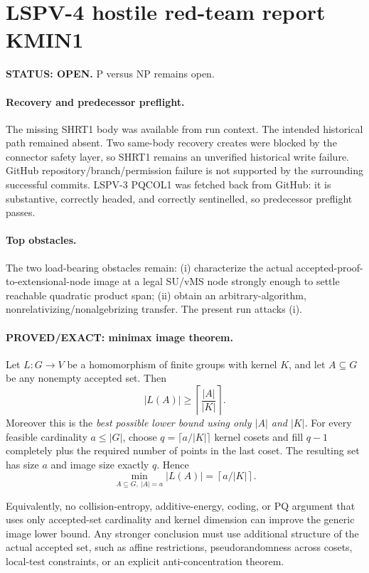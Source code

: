 \documentclass[11pt]{article}
\begin{document}
\section*{LSPV-4 hostile red-team report KMIN1}
\textbf{STATUS: OPEN.} P versus NP remains open.

\paragraph{Recovery and predecessor preflight.}
The missing SHRT1 body was available from run context. The intended historical path remained absent. Two same-body recovery creates were blocked by the connector safety layer, so SHRT1 remains an unverified historical write failure. GitHub repository/branch/permission failure is not supported by the surrounding successful commits. LSPV-3 PQCOL1 was fetched back from GitHub: it is substantive, correctly headed, and correctly sentinelled, so predecessor preflight passes.

\paragraph{Top obstacles.}
The two load-bearing obstacles remain: (i) characterize the actual accepted-proof-to-extensional-node image at a legal SU/vMS node strongly enough to settle reachable quadratic product span; (ii) obtain an arbitrary-algorithm, nonrelativizing/nonalgebrizing transfer. The present run attacks (i).

\paragraph{PROVED/EXACT: minimax image theorem.}
Let $L:G\to V$ be a homomorphism of finite groups with kernel $K$, and let $A\subseteq G$ be any nonempty accepted set. Then
\[
|L(A)|\ge \left\lceil\frac{|A|}{|K|}\right\rceil.
\]
Moreover this is the \emph{best possible lower bound using only $|A|$ and $|K|$}. For every feasible cardinality $a\le |G|$, choose $q=\lceil a/|K|\rceil$ kernel cosets and fill $q-1$ completely plus the required number of points in the last coset. The resulting set has size $a$ and image size exactly $q$. Hence
\[
\boxed{\min_{A\subseteq G,\ |A|=a}|L(A)|=\left\lceil a/|K|\right\rceil.}
\]

Equivalently, no collision-entropy, additive-energy, coding, or PQ argument that uses only accepted-set cardinality and kernel dimension can improve the generic image lower bound. Any stronger conclusion must use additional structure of the actual accepted set, such as affine restrictions, pseudorandomness across cosets, local-test constraints, or an explicit anti-concentration theorem.
\end{document}
